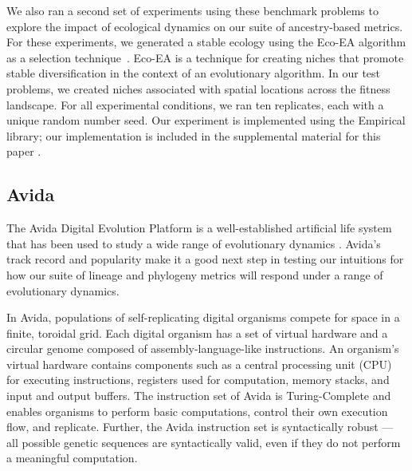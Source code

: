 \documentclass[letterpaper]{article}
\begin{document}
We also ran a second set of experiments using these benchmark problems to explore the impact of ecological dynamics on our suite of ancestry-based metrics. For these experiments, we generated a stable ecology using the Eco-EA algorithm as a selection technique~\citep{goings_ecology-based_2012}. Eco-EA is a technique for creating niches that promote stable diversification in the context of an evolutionary algorithm. In our test problems, we created niches associated with spatial locations across the fitness landscape. For all experimental conditions, we ran ten replicates, each with a unique random number seed. Our experiment is implemented using the Empirical library; our implementation is included in the supplemental material for this paper \citep{zenodo_supplement}. 

\subsection{Avida}



The Avida Digital Evolution Platform \citep{ofria_avida:_2004} is a well-established artificial life system that has been used to study a wide range of evolutionary dynamics \citep{lenski_evolutionary_2003, goldsby_task-switching_2012,zaman_coevolution_2014, dolson_effects_2016}.
Avida's track record and popularity make it a good next step in testing our intuitions for how our suite of lineage and phylogeny metrics will respond under a range of evolutionary dynamics.

In Avida, populations of self-replicating digital organisms compete for space in a finite, toroidal grid. 
Each digital organism has a set of virtual hardware and a circular genome composed of assembly-language-like instructions.
An organism's virtual hardware contains components such as a central processing unit (CPU) for executing instructions, registers used for computation, memory stacks, and input and output buffers. 
The instruction set of Avida is Turing-Complete and enables organisms to perform basic computations, control their own execution flow, and replicate. 
Further, the Avida instruction set is syntactically robust --- all possible genetic sequences are syntactically valid, even if they do not perform a meaningful computation.
\end{document}
